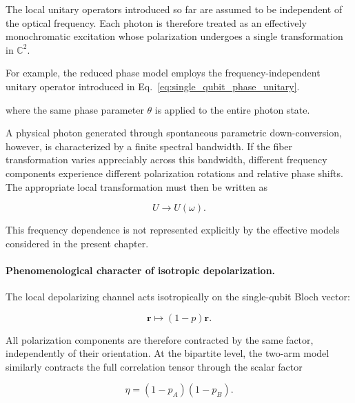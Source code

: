The local unitary operators introduced so far are assumed to be independent of the optical frequency. Each photon is therefore treated as an effectively monochromatic excitation whose polarization undergoes a single transformation in \( \mathbb{C}^2 \).

For example, the reduced phase model employs the frequency-independent unitary operator introduced in Eq.~\eqref{eq:single_qubit_phase_unitary}.


where the same phase parameter \( \theta \) is applied to the entire photon state.

\medskip

A physical photon generated through spontaneous parametric down-conversion, however, is characterized by a finite spectral bandwidth. If the fiber transformation varies appreciably across this bandwidth, different frequency components experience different polarization rotations and relative phase shifts. The appropriate local transformation must then be written as

\begin{equation}
U
\longrightarrow
U(\omega).
\label{eq:frequency_dependent_extension_ch5}
\end{equation}

This frequency dependence is not represented explicitly by the effective models considered in the present chapter.

\medskip

\paragraph{Phenomenological character of isotropic depolarization.}

The local depolarizing channel acts isotropically on the single-qubit Bloch vector:

\begin{equation}
\mathbf{r}
\longmapsto
(1-p)\mathbf{r}.
\label{eq:isotropic_bloch_contraction_limitation}
\end{equation}

All polarization components are therefore contracted by the same factor, independently of their orientation. At the bipartite level, the two-arm model similarly contracts the full correlation tensor through the scalar factor

\begin{equation}
\eta
=
(1-p_A)(1-p_B).
\label{eq:isotropic_tensor_factor_limitation}
\end{equation}

